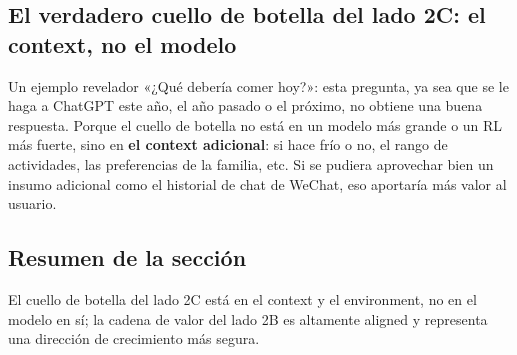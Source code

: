 \subsection{El verdadero cuello de botella del lado 2C: el context, no el modelo}

\begin{knowledgebox}{Un ejemplo revelador}
«¿Qué debería comer hoy?»: esta pregunta, ya sea que se le haga a ChatGPT este año, el año pasado o el próximo, no obtiene una buena respuesta. Porque el cuello de botella no está en un modelo más grande o un RL más fuerte, sino en \textbf{el context adicional}: si hace frío o no, el rango de actividades, las preferencias de la familia, etc. Si se pudiera aprovechar bien un insumo adicional como el historial de chat de WeChat, eso aportaría más valor al usuario.
\end{knowledgebox}

\subsection{Resumen de la sección}

El cuello de botella del lado 2C está en el context y el environment, no en el modelo en sí; la cadena de valor del lado 2B es altamente aligned y representa una dirección de crecimiento más segura.

